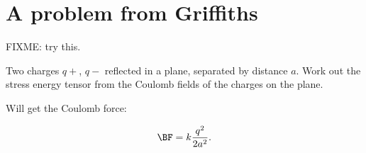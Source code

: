 %
%

\section{A problem from Griffiths}

FIXME: try this.

Two charges \(q+\), \(q-\) reflected in a plane, separated by distance \(a\).  Work out the stress energy tensor from the Coulomb fields of the charges on the plane.

Will get the Coulomb force:

\begin{equation}\label{eqn:relativisticElectrodynamicsT9:330}
\BF = k \frac{q^2}{2 a^2}.
\end{equation}

